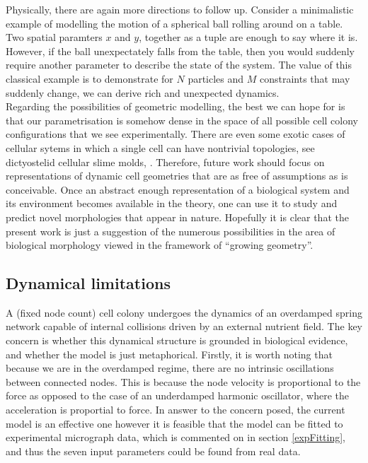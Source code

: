 Physically, there are again more directions to follow up. Consider a minimalistic 
example of modelling the motion of a spherical ball rolling around on a table.
Two spatial paramters $x$ and $y$, together as a tuple are enough to say where it is. However, 
if the ball unexpectately falls from the table, then you would suddenly require
another parameter to describe the state of the system. The value of this classical example
is to demonstrate for $N$ particles and $M$ constraints that may suddenly change, 
we can derive rich and unexpected dynamics.
\\

Regarding the possibilities of geometric modelling, the best we can hope for is that 
our parametrisation is somehow dense in the space
of all possible cell colony configurations that we see experimentally. There are even
some exotic cases of cellular sytems in which a single cell can have nontrivial topologies, 
see dictyostelid cellular slime molds, \cite{glockner2016multicellularity}. Therefore, future work 
should focus on representations of dynamic cell geometries that are as free of assumptions as
is conceivable. Once an abstract enough representation of a biological system and its environment
becomes available in the theory, one can use it to study and predict novel morphologies that appear 
in nature. Hopefully it is clear that the present work is just a suggestion of the numerous possibilities
in the area of biological morphology viewed in the framework of ``growing geometry''.

\subsection{Dynamical limitations}
A (fixed node count) cell colony undergoes the dynamics of an overdamped spring network capable
of internal collisions driven by
an external nutrient field. The key concern is whether this dynamical structure is grounded in 
biological evidence, and whether the model is just metaphorical. Firstly, 
it is worth noting that because we are in the overdamped regime,
there are no intrinsic oscillations between connected nodes. This is because the node velocity 
is proportional to the force as opposed to the case 
of an underdamped harmonic oscillator, where the acceleration is proportial to force.
In answer to the concern posed, the current model is an effective one however
it is feasible that the model can be fitted to experimental micrograph data, 
which is commented on in section \ref{expFitting}, and thus the seven input parameters 
could be found from real data.
\\

